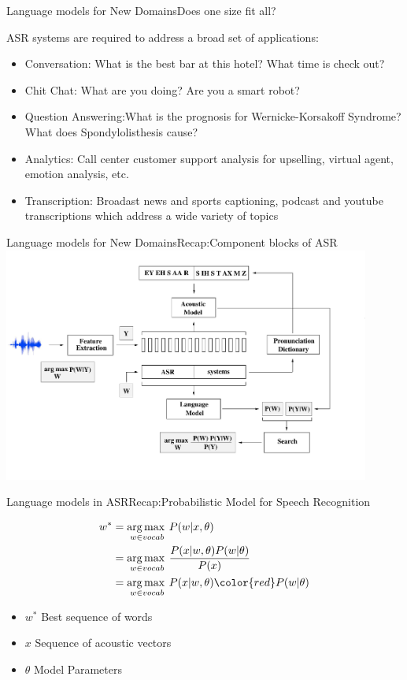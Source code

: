 \begin{frame} {Language models for New Domains}{Does one size fit all?}

ASR systems are required to address a broad set of applications:
 \begin{itemize}
 \item  {\color{red}Conversation:} What is the best bar at this hotel?  What time is check out?
 \item  {\color{red}Chit Chat:} What are you doing? Are you a smart robot?
 \item  {\color{red}Question Answering:}What is the prognosis for Wernicke-Korsakoff Syndrome? What does Spondylolisthesis cause?
 \item  {\color{red} Analytics:} Call center customer support analysis for upselling, virtual agent, emotion analysis, etc.
 \item {\color{red}Transcription:} Broadast news and sports captioning, podcast and youtube transcriptions which address a wide variety of topics
 \end{itemize}

\end{frame}

\begin{frame}{Language models for New Domains}{Recap:Component blocks of ASR}
\includegraphics[height=77mm]{figures/ASR9}
\end{frame}

\begin{frame} {Language models in ASR}{Recap:Probabilistic Model for Speech Recognition}

\begin{align*}
w^* & = \argmax_{w \in vocab} P(w | x, \theta) \\
       & = \argmax_{w \in vocab} \frac{P(x | w, \theta) P(w | \theta)} { P(x)} \\
       & = \argmax_{w \in vocab} P(x | w, \theta)  { \color{red} P(w | \theta)} \\
\end{align*}

\begin{itemize}
\item $w^*$  Best sequence of words
\item $x$ Sequence of acoustic vectors
\item $\theta$  Model Parameters
\end{itemize}
\end{frame}

